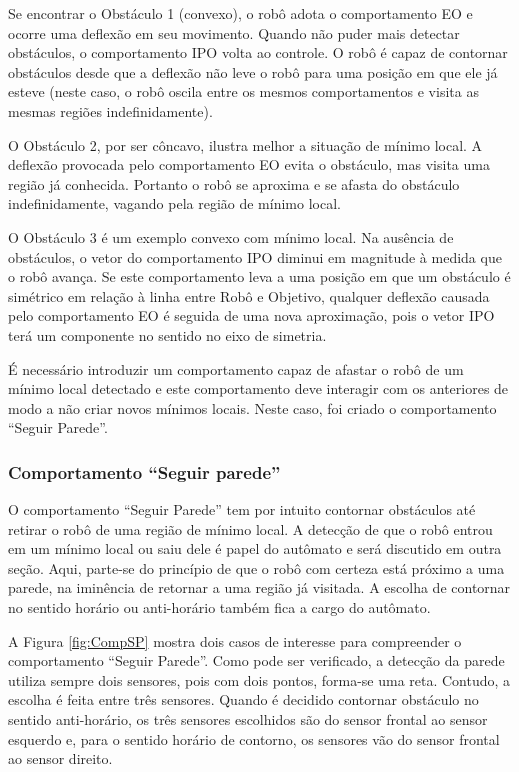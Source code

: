 		
		
		Se encontrar o Obstáculo 1 (convexo), o robô adota o comportamento EO e ocorre uma deflexão
		em seu movimento. Quando não puder mais detectar obstáculos, o comportamento IPO volta ao 
		controle. O robô é capaz de contornar obstáculos desde que a deflexão não leve o 
		robô para uma posição em que ele já esteve (neste caso, o robô oscila entre os mesmos 
		comportamentos e visita as mesmas regiões indefinidamente). 
		
		O Obstáculo 2, por ser côncavo, ilustra melhor a situação de mínimo local. A deflexão 
		provocada pelo comportamento EO evita o obstáculo, mas visita uma região já conhecida. 
		Portanto o robô se aproxima e se afasta do obstáculo indefinidamente, vagando pela região
		de mínimo local. 
		 
		O Obstáculo 3 é um exemplo convexo com mínimo local. Na ausência de obstáculos, o vetor 
		do comportamento IPO diminui em magnitude à medida que o robô avança. Se este 
		comportamento leva a uma posição em que um obstáculo é simétrico em relação à linha entre 
		Robô e Objetivo, qualquer deflexão causada pelo comportamento EO é seguida de uma nova 
		aproximação, pois o vetor IPO terá um componente no sentido no eixo de simetria. 
		
		É necessário introduzir um comportamento capaz de afastar o robô de um mínimo local 
		detectado e este comportamento deve interagir com os anteriores de modo a não criar 
		novos mínimos locais. Neste caso, foi criado o comportamento ``Seguir Parede''.
		
		\subsubsection{Comportamento ``Seguir parede''}
		
		O comportamento ``Seguir Parede'' tem por intuito contornar obstáculos até retirar o robô 
		de uma região de mínimo local. A detecção de que o robô entrou em um mínimo local ou saiu 
		dele é papel do autômato e será discutido em outra seção. Aqui, parte-se do princípio de 
		que o robô com certeza está próximo a uma parede, na iminência de retornar a uma região 
		já visitada. A escolha de contornar no sentido horário ou anti-horário também fica a 
		cargo do autômato. 
		
		A Figura \ref{fig:CompSP} mostra dois casos de interesse para compreender o comportamento
		``Seguir Parede''. Como pode ser verificado, a detecção da parede utiliza sempre dois 
		sensores, pois com dois pontos, forma-se uma reta. Contudo, a escolha é feita entre três
		sensores. Quando é decidido contornar obstáculo no sentido anti-horário, os três sensores
		escolhidos são do sensor frontal ao sensor esquerdo e, para o sentido horário de contorno,
		os sensores vão do sensor frontal ao sensor direito.
		
